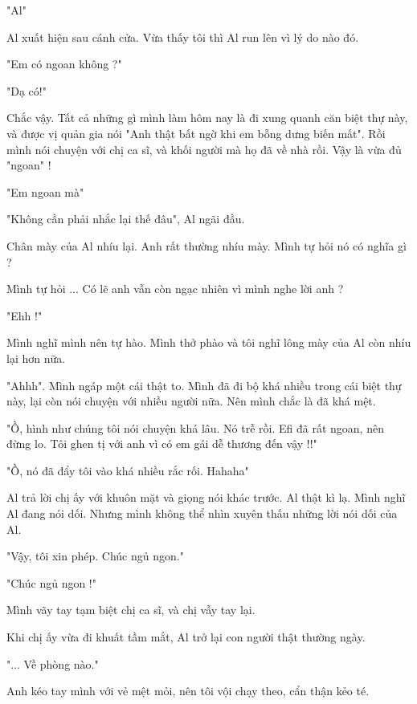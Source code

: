 "Al"

Al xuất hiện sau cánh cửa. Vừa thấy tôi thì Al run lên vì lý do nào đó.

"Em có ngoan không ?"

"Dạ có!"

Chắc vậy. Tất cả những gì mình làm hôm nay là đi xung quanh căn biệt thự này, và được vị quản gia nói "Anh thật bất ngờ khi em bỗng dưng biến mất". Rồi mình nói chuyện với chị ca sĩ, và khối người mà họ đã về nhà rồi. Vậy là vừa đủ "ngoan" !

"Em ngoan mà"

"Không cần phải nhắc lại thế đâu", Al ngãi đầu.

Chân mày của Al nhíu lại. Anh rất thường nhíu mày. Mình tự hỏi nó có nghĩa gì ?

Mình tự hỏi ... Có lẽ anh vẫn còn ngạc nhiên vì mình nghe lời anh ?

"Ehh !"

Mình nghĩ mình nên tự hào. Mình thở phào và tôi nghĩ lông mày của Al còn nhíu lại hơn nữa.

"Ahhh". Mình ngáp một cái thật to. Mình đã đi bộ khá nhiều trong cái biệt thự này, lại còn nói chuyện với nhiều người nữa. Nên mình chắc là đã khá mệt.

"Ồ, hình như chúng tôi nói chuyện khá lâu. Nó trễ rồi. Efi đã rất ngoan, nên đừng lo. Tôi ghen tị với anh vì có em gái dễ thương đến vậy !!"

"Ồ, nó đã đẩy tôi vào khá nhiều rắc rối. Hahaha"

Al trả lời chị ấy với khuôn mặt và giọng nói khác trước. Al thật kì lạ. Mình nghĩ Al đang nói dối. Nhưng mình không thể nhìn xuyên thấu những lời nói dối của Al.

"Vậy, tôi xin phép. Chúc ngủ ngon."

"Chúc ngủ ngon !"

Mình vãy tay tạm biệt chị ca sĩ, và chị vẫy tay lại.

Khi chị ấy vừa đi khuất tầm mắt, Al trở lại con người thật thường ngày.

"... Về phòng nào."

Anh kéo tay mình với vẻ mệt mỏi, nên tôi vội chạy theo, cẩn thận kẻo té.\\




 
